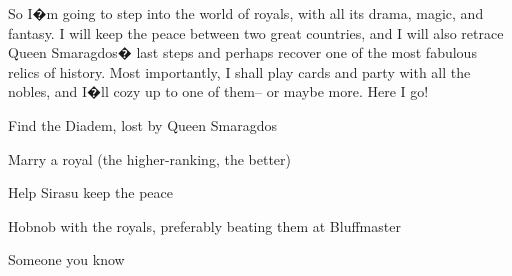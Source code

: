 \documentclass[char]{Kos}
\begin{document}
So I�m going to step into the world of royals, with all its drama, magic, and fantasy. I will keep the peace between two great countries, and I will also retrace Queen Smaragdos� last steps and perhaps recover one of the most fabulous relics of history. Most importantly, I shall play cards and party with all the nobles, and I�ll cozy up to one of them-- or maybe more. Here I go!

\begin{itemz}[Goals]
\item Find the Diadem, lost by Queen Smaragdos
\item Marry a royal (the higher-ranking, the better)
\item Help Sirasu keep the peace
\item Hobnob with the royals, preferably beating them at Bluffmaster
\end{itemz}

\begin{contacts}
\contact{\cAnarchist{}} Someone you know
\end{contacts}
\end{document}
